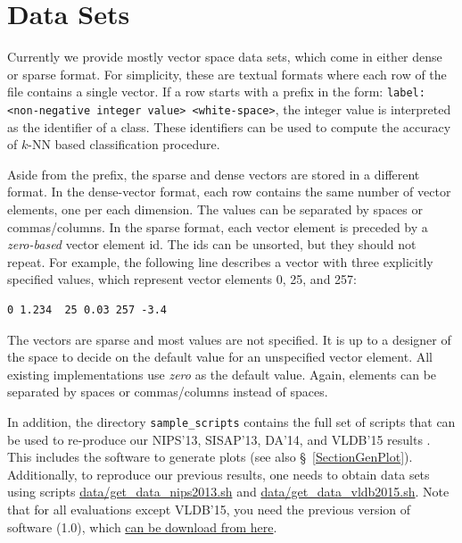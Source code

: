\documentclass[runningheads,a4paper]{llncs}
\newcommand{\replocfile}{https://github.com/searchivarius/NonMetricSpaceLib/blob/pserv/}
\newcommand{\ttt}[1]{\texttt{#1}}
\newcommand{\knn}{$k$-NN }
\begin{document}
\section{Data Sets}
\label{SectionDatasets}
Currently we provide mostly vector space data sets,
which come in either dense or sparse format.
For simplicity, these are textual formats where each row of the file contains a single vector.
If a row starts with a prefix in the form: \ttt{label:<non-negative integer value> <white-space>},
the integer value is interpreted as the identifier of a class.
These identifiers can be used to compute the accuracy of \knn based classification procedure.

Aside from the prefix, the sparse and dense vectors are stored in a different format.
In the dense-vector format, each row
contains the same number of vector elements, one per each dimension.
The values can be separated by spaces or commas/columns.
In the sparse format, each vector element is preceded
by a \emph{zero-based} vector element id. 
The ids can be unsorted, but they should not repeat.
For example, the following line
describes a vector with three explicitly specified values,
which represent vector elements 0, 25, and 257:
\begin{verbatim}
0 1.234  25 0.03 257 -3.4 
\end{verbatim}

The vectors are sparse and most values are not specified.
It is up to a designer of the space to decide on the default value for an unspecified vector element.
All existing implementations use \emph{zero} as the default value.
Again, elements can be separated by spaces or commas/columns instead of spaces.

In addition, the directory \ttt{sample\_scripts} contains the full set of scripts that can be used to re-produce our NIPS'13, SISAP'13, DA'14, and VLDB'15 results \cite{Boytsov_and_Bilegsaikhan:sisap2013,Boytsov_and_Bilegsaikhan:nips2013,ponomarenko2014comparative,naidan2015permutation}.
This includes the software to generate plots (see also \S~\ref{SectionGenPlot}). 
Additionally, to reproduce our previous results, one needs to obtain data sets using scripts
\href{\replocfile data/get_data_nips2013.sh}{data/get\_data\_nips2013.sh} 
and \href{\replocfile data/get_data_vldb2015.sh}{data/get\_data\_vldb2015.sh}. 
Note that for all evaluations except VLDB'15, you need the previous version of software (1.0),
which \href{https://github.com/searchivarius/NonMetricSpaceLib/releases}{can be download from here}.
\end{document}
